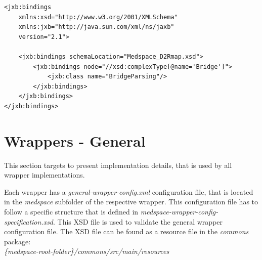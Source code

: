 \begin{lstlisting}[style=RdfCodeStyle, caption=JAXB binding example, label=jaxbExample]
<jxb:bindings 
    xmlns:xsd="http://www.w3.org/2001/XMLSchema"
    xmlns:jxb="http://java.sun.com/xml/ns/jaxb"
    version="2.1">

    <jxb:bindings schemaLocation="Medspace_D2Rmap.xsd">
		<jxb:bindings node="//xsd:complexType[@name='Bridge']">
			<jxb:class name="BridgeParsing"/>
		</jxb:bindings>
    </jxb:bindings>
</jxb:bindings>
\end{lstlisting}

\section{Wrappers - General}

This section targets to present implementation details, that is used by all wrapper implementations.

Each wrapper has a \emph{general-wrapper-config.xml} configuration file, that is located in the \emph{medspace} subfolder of the respective wrapper. This configuration file has to follow a specific structure that is defined in \emph{medspace-wrapper-config-specification.xsd}. This XSD file is used to validate the general wrapper configuration file. The XSD file can be found as a resource file in the \emph{commons} package: \\
\emph{\{medspace-root-folder\}/commons/src/main/resources}

